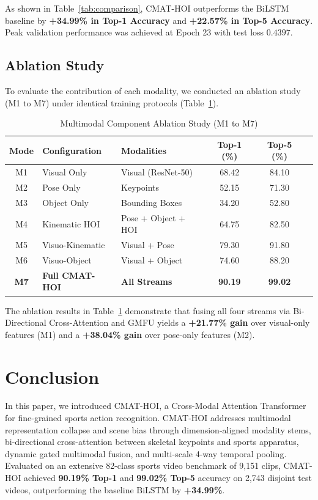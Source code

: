 \documentclass[10pt,journal,compsoc]{IEEEtran}
\begin{document}
As shown in Table~\ref{tab:comparison}, CMAT-HOI outperforms the BiLSTM baseline by \textbf{+34.99\% in Top-1 Accuracy} and \textbf{+22.57\% in Top-5 Accuracy}. Peak validation performance was achieved at Epoch 23 with test loss $0.4397$.

\subsection{Ablation Study}
To evaluate the contribution of each modality, we conducted an ablation study (M1 to M7) under identical training protocols (Table~\ref{tab:ablation}).

\begin{table}[h]
\caption{Multimodal Component Ablation Study (M1 to M7)}
\label{tab:ablation}
\centering
\begin{tabular}{cllccc}
\toprule
\textbf{Mode} & \textbf{Configuration} & \textbf{Modalities} & \textbf{Top-1 (\%)} & \textbf{Top-5 (\%)} \\
\midrule
M1 & Visual Only & Visual (ResNet-50) & 68.42 & 84.10 \\
M2 & Pose Only & Keypoints & 52.15 & 71.30 \\
M3 & Object Only & Bounding Boxes & 34.20 & 52.80 \\
M4 & Kinematic HOI & Pose + Object + HOI & 64.75 & 82.50 \\
M5 & Visuo-Kinematic & Visual + Pose & 79.30 & 91.80 \\
M6 & Visuo-Object & Visual + Object & 74.60 & 88.20 \\
\textbf{M7} & \textbf{Full CMAT-HOI} & \textbf{All Streams} & \textbf{90.19} & \textbf{99.02} \\
\bottomrule
\end{tabular}
\end{table}

The ablation results in Table~\ref{tab:ablation} demonstrate that fusing all four streams via Bi-Directional Cross-Attention and GMFU yields a \textbf{+21.77\% gain} over visual-only features (M1) and a \textbf{+38.04\% gain} over pose-only features (M2).

\section{Conclusion}
In this paper, we introduced CMAT-HOI, a Cross-Modal Attention Transformer for fine-grained sports action recognition. CMAT-HOI addresses multimodal representation collapse and scene bias through dimension-aligned modality stems, bi-directional cross-attention between skeletal keypoints and sports apparatus, dynamic gated multimodal fusion, and multi-scale 4-way temporal pooling. Evaluated on an extensive 82-class sports video benchmark of 9,151 clips, CMAT-HOI achieved \textbf{90.19\% Top-1} and \textbf{99.02\% Top-5} accuracy on 2,743 disjoint test videos, outperforming the baseline BiLSTM by \textbf{+34.99\%}.



\end{document}
